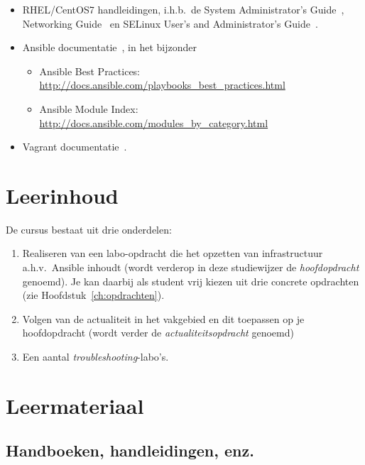 \begin{itemize}
  \item RHEL/CentOS7 handleidingen, i.h.b.~de System Administrator's Guide~\autocite{SvistunovEtAl2016}, Networking Guide~\autocite{JahodaEtAl2016} en SELinux User's and Administrator's Guide~\autocite{JahodaEtAl2016a}.
  \item Ansible documentatie~\autocite{Ansible2016}, in het bijzonder
  
  \begin{itemize}
    \item Ansible Best Practices: \url{http://docs.ansible.com/playbooks_best_practices.html}
    \item Ansible Module Index: \url{http://docs.ansible.com/modules_by_category.html}
  \end{itemize}
  \item Vagrant documentatie~\autocite{Hashicorp}.
\end{itemize}

\section{Leerinhoud}
\label{sec:leerinhoud}

De cursus bestaat uit drie onderdelen:

\begin{enumerate}
  \item Realiseren van een labo-opdracht die het opzetten van infrastructuur a.h.v.~Ansible inhoudt (wordt verderop in deze studiewijzer de \emph{hoofdopdracht} genoemd). Je kan daarbij als student vrij kiezen uit drie concrete opdrachten (zie Hoofdstuk~\ref{ch:opdrachten}).
  \item Volgen van de actualiteit in het vakgebied en dit toepassen op je hoofdopdracht (wordt verder de \emph{actualiteitsopdracht} genoemd)
  \item Een aantal \emph{troubleshooting}-labo's.
\end{enumerate}

\section{Leermateriaal}
\label{sec:leermateriaal}

\subsection{Handboeken, handleidingen, enz.}
\label{ssec:handboeken}

